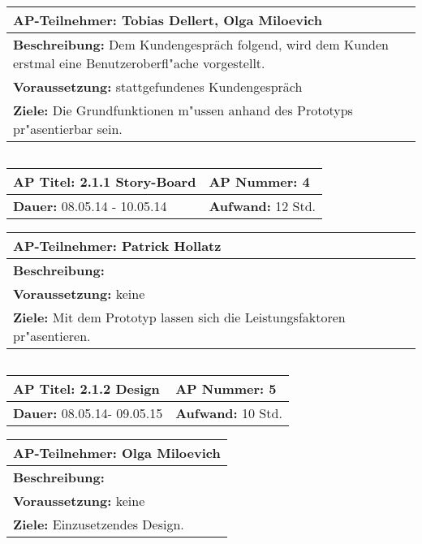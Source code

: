 \begin{tabular}{|p{15.3cm}|}
\hline
\textbf{AP-Teilnehmer: }Tobias Dellert, Olga Miloevich\\
\hline
\textbf{Beschreibung: }Dem Kundengespräch folgend, wird dem Kunden erstmal eine Benutzeroberfl"ache vorgestellt.\\
\hline
\textbf{Voraussetzung: }stattgefundenes Kundengespräch\\
\hline 
\textbf{Ziele: }Die Grundfunktionen m"ussen anhand des Prototyps pr"asentierbar sein.\\
\hline 
\end{tabular}
\begin{verbatim}

\end{verbatim}
\begin{tabular}{|p{7.43cm}|p{7.43cm}|}
\hline
\textbf{AP Titel: }2.1.1 Story-Board & \textbf{AP Nummer: }4 \\ 
\hline
\textbf{Dauer: }08.05.14 - 10.05.14 & \textbf{Aufwand: }12 Std.\\
\hline
\end{tabular}
\begin{tabular}{|p{15.3cm}|}
\hline
\textbf{AP-Teilnehmer: }Patrick Hollatz\\
\hline
\textbf{Beschreibung: }\\
\hline
\textbf{Voraussetzung: }keine\\
\hline 
\textbf{Ziele: }Mit dem Prototyp lassen sich die Leistungsfaktoren pr"asentieren.\\
\hline 
\end{tabular}
\begin{verbatim}

\end{verbatim}
\begin{tabular}{|p{7.43cm}|p{7.43cm}|}
\hline
\textbf{AP Titel: }2.1.2 Design & \textbf{AP Nummer: }5 \\ 
\hline
\textbf{Dauer: }08.05.14- 09.05.15 & \textbf{Aufwand: }10 Std.\\
\hline
\end{tabular}
\begin{tabular}{|p{15.3cm}|}
\hline
\textbf{AP-Teilnehmer: }Olga Miloevich\\
\hline
\textbf{Beschreibung: }\\
\hline
\textbf{Voraussetzung: }keine\\
\hline 
\textbf{Ziele: }Einzusetzendes Design.\\
\hline 
\end{tabular}
